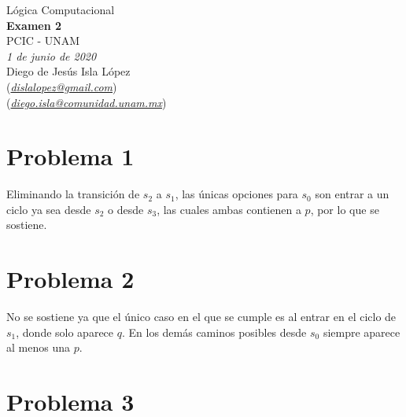 \documentclass[letterpaper,12pt]{memoir}
\theoremstyle{definition}
\begin{document}
\begin{center}
  {\large Lógica Computacional}\\
  \vspace{0.2cm}
  {\large\bfseries Examen 2}\\
  \vspace{0.2cm}
  {\large PCIC - UNAM}\\
  \vspace{0.5cm}
  {\itshape 1 de junio de 2020}\\
  \vspace{0.5cm}
  Diego de Jesús Isla López\\
  (\href{mailto:dislalopez@gmail.com}{\itshape dislalopez@gmail.com})\\
  (\href{mailto:diego.isla@comunidad.unam.mx}{\itshape diego.isla@comunidad.unam.mx})\\
\end{center}


\section*{Problema 1}

Eliminando la transición de \(s_2\) a \(s_1\), las únicas opciones para \(s_0\) son entrar a un ciclo ya sea desde \(s_2\) o desde \(s_3\), las cuales ambas contienen a \(p\), por lo que se sostiene.

\section*{Problema 2}

No se sostiene ya que el único caso en el que se cumple es al entrar en el ciclo de \(s_1\), donde solo aparece \(q\). En los demás caminos posibles desde \(s_0\) siempre aparece al menos una \(p\).

\section*{Problema 3}
\end{document}
